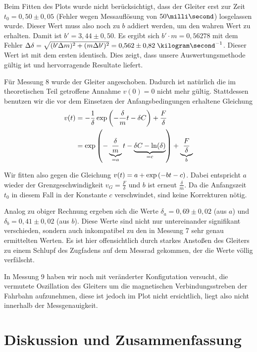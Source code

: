 \documentclass[a4paper,german,12pt,smallheadings]{scrartcl}
\begin{document}
Beim Fitten des Plots wurde nicht berücksichtigt, dass der Gleiter erst zur
Zeit $t_0 = 0{,}50 \pm 0{,}05$ (Fehler wegen Messauflösung von $50
\milli\second$) losgelassen wurde. Dieser Wert muss also noch zu $b$ addiert
werden, um den wahren Wert zu erhalten. Damit ist $b' = 3{,}44 \pm 0{,}50$. Es
ergibt sich $b' \cdot m = 0{,}56278$ mit dem Fehler $\Delta \delta = \sqrt{(b'
\Delta m)^2 + (m \Delta b')^2} = 0{,}562\pm0{,}82 \; \kilogram\second^{-1}$.
Dieser Wert ist mit dem ersten identisch. Dies zeigt, dass unsere
Auswertungsmethode gültig ist und hervorragende Resultate liefert.

Für Messung 8 wurde der Gleiter angeschoben. Dadurch ist natürlich die im
theoretischen Teil getroffene Annahme $v(0) = 0$ nicht mehr gültig. Stattdessen
benutzen wir die vor dem Einsetzen der Anfangsbedingungen erhaltene Gleichung
\begin{align*}
  v(t) &= -\frac{1}{\delta} \exp \del{ - \frac{\delta}{m} t - \delta C} + \frac{F}{\delta} \\
       &= \exp \del{ - \underbrace{\frac{\delta}{m}}_{=a} t - \underbrace{\delta C - \ln(\delta)}_{=c}} + \underbrace{\frac{F}{\delta}}_{b} \\
\end{align*}

Wir fitten also gegen die Gleichung $v(t) = a + \exp\del{-bt-c}$. Dabei
entspricht $a$ wieder der Grenzgeschwindigkeit $v_G = \frac{F}{\delta}$ und $b$
ist erneut $\frac{\delta}{m}$. Da die Anfangszeit $t_0$ in diesem Fall in der
Konstante $c$ verschwindet, sind keine Korrekturen nötig.

Analog zu obiger Rechnung ergeben sich die Werte $\delta_a = 0{,}69 \pm 0{,}02$
(aus $a$) und $\delta_b = 0{,}41\pm0{,}02$ (aus $b$). Diese Werte sind nicht
nur untereinander signifikant verschieden, sondern auch inkompatibel zu den in
Messung 7 sehr genau ermittelten Werten. Es ist hier offensichtlich durch starkes
Anstoßen des Gleiters zu einem Schlupf des Zugfadens auf dem Messrad gekommen,
der die Werte völlig verfälscht.

In Messung 9 haben wir noch mit veränderter Konfigutation versucht, die
vermutete Oszillation des Gleiters um die magnetischen Verbindungsstreben der
Fahrbahn aufzunehmen, diese ist jedoch im Plot nicht ersichtlich, liegt also
nicht innerhalb der Messgenauigkeit.

\section*{Diskussion und Zusammenfassung}
\end{document}

